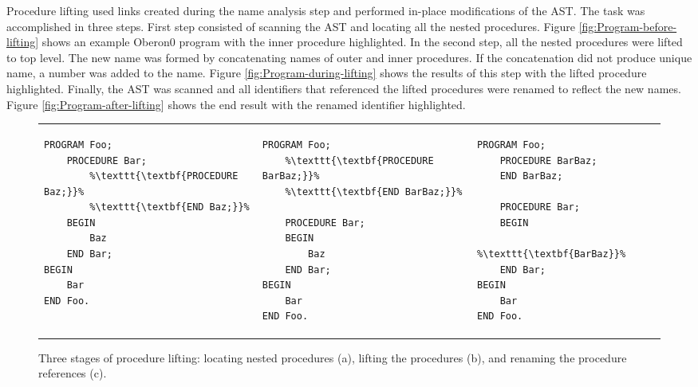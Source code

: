 Procedure lifting used links created during the name analysis step
and performed in-place modifications of the AST. The task was accomplished
in three steps. First step consisted of scanning the AST and locating
all the nested procedures. Figure \ref{fig:Program-before-lifting}
shows an example Oberon0 program with the inner procedure highlighted.
In the second step, all the nested procedures were lifted to top level.
The new name was formed by concatenating names of outer and inner
procedures. If the concatenation did not produce unique name, a number
was added to the name. Figure \ref{fig:Program-during-lifting} shows
the results of this step with the lifted procedure highlighted. Finally,
the AST was scanned and all identifiers that referenced the lifted
procedures were renamed to reflect the new names. Figure \ref{fig:Program-after-lifting}
shows the end result with the renamed identifier highlighted.

%
\begin{figure}[!h]
\begin{tabular}{>{\centering}p{}>{\centering}p{}>{\centering}p{}}
{\scriptsize }
\begin{lstlisting}[basicstyle={\footnotesize\ttfamily},escapechar={\%},showlines=true]
PROGRAM Foo;
    PROCEDURE Bar;
        %\texttt{\textbf{PROCEDURE Baz;}}%
        %\texttt{\textbf{END Baz;}}%
    BEGIN
        Baz
    END Bar;
BEGIN
    Bar
END Foo.
 
\end{lstlisting}
{\scriptsize \par}

\subfloat[\label{fig:Program-before-lifting}]{} & {\scriptsize }
\begin{lstlisting}[basicstyle={\footnotesize\ttfamily},escapechar={\%}]
PROGRAM Foo;
    %\texttt{\textbf{PROCEDURE BarBaz;}}%
    %\texttt{\textbf{END BarBaz;}}%
 
    PROCEDURE Bar;
    BEGIN
        Baz
    END Bar;
BEGIN
    Bar
END Foo.
\end{lstlisting}
{\scriptsize \par}

\subfloat[\label{fig:Program-during-lifting}]{} & {\scriptsize }
\begin{lstlisting}[basicstyle={\footnotesize\ttfamily},escapechar={\%}]
PROGRAM Foo;
    PROCEDURE BarBaz;
    END BarBaz;
 
    PROCEDURE Bar;
    BEGIN
        %\texttt{\textbf{BarBaz}}%
    END Bar;
BEGIN
    Bar
END Foo.
\end{lstlisting}
{\scriptsize \par}

\subfloat[\label{fig:Program-after-lifting}]{}\tabularnewline
\end{tabular}

\caption{Three stages of procedure lifting: locating nested procedures (a),
lifting the procedures (b), and renaming the procedure references
(c).}

\end{figure}



